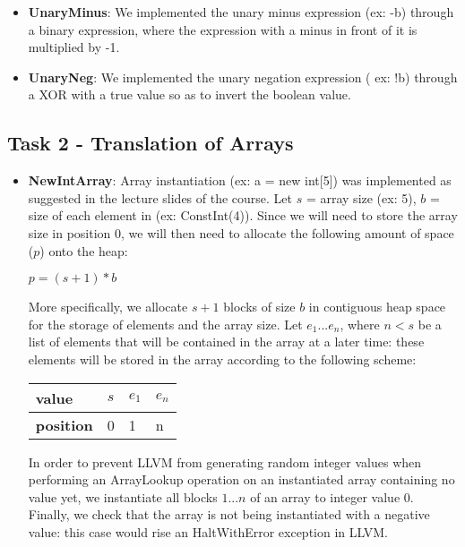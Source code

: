 \documentclass[paper=a4, fontsize=11pt]{scrartcl}
\numberwithin{equation}{section}		%
\numberwithin{figure}{section}			%
\numberwithin{table}{section}				%
\begin{document}
\begin{itemize}
	\item \textbf{UnaryMinus}: We implemented the unary minus expression (ex: -b) through a binary expression, where the expression with a minus in front of it is multiplied by -1. 
	\item \textbf{UnaryNeg}: We implemented the unary negation expression ( ex: !b) through a XOR with a true value so as to invert the boolean value. 
\end{itemize}

\subsection*{Task 2 - Translation of Arrays}
\begin{itemize}

\item \textbf{NewIntArray}: Array instantiation (ex: a = new int[5]) was implemented as suggested in the lecture slides of the course. Let $s$ = array size (ex: 5), $b$ = size of each element in (ex: ConstInt(4)). Since we will need to store the array size in position 0, we will then need to allocate the following amount of space ($p$) onto the heap:\\
\begin{center}
 $p = (s + 1) * b$
\end{center}
More specifically, we allocate $s + 1$ blocks of size $b$ in contiguous heap space for the storage of elements and the array size. Let $e_1... e_n$, where $n < s$ be a list of elements that will be contained in the array at a later time: these elements will be stored in the array according to the following scheme:
\begin{center}
\begin{table}[h]
\centering
\begin{tabular}{|l|l|l|l|}
\hline
\textbf{value}    & $s$ & $e_1$ & $e_n$ \\ \hline
\textbf{position} & 0      & 1  & n  \\ \hline
\end{tabular}
\end{table}
\end{center}
In order to prevent LLVM from generating random integer values when performing an ArrayLookup operation on an instantiated array containing no value yet, we instantiate all blocks $1...n$ of an array to integer value 0. 
Finally, we check that the array is not being instantiated with a negative value: this case would rise an HaltWithError exception in LLVM. 


\end{itemize}
\end{document}

